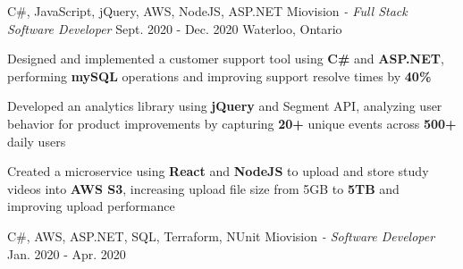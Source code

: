 \begin{siderules}
  \begin{cventries}
    \cventry
    {C\#, JavaScript, jQuery, AWS, NodeJS, ASP.NET}
    {Miovision\hspace{0.15em} \bodyfontlight\itshape{- Full Stack Software Developer}}
    {Sept. 2020 - Dec. 2020}
    {Waterloo, Ontario}
    {
      \begin{cvitems}
        \item{Designed and implemented a customer support tool using \textbf{C\#} and \textbf{ASP.NET}, performing \textbf{mySQL} operations and improving support resolve times by \textbf{40\%} }
        \item{Developed an analytics library using \textbf{jQuery} and Segment API, analyzing user behavior for product improvements by capturing \textbf{20+} unique events across \textbf{500+} daily users}
        \item {Created a microservice using \textbf{React} and \textbf{NodeJS} to upload and store study videos into \textbf{AWS S3}, increasing upload file size from 5GB to \textbf{5TB} and improving upload performance }
      \end{cvitems}
    }
    \cventry
    {C\#, AWS, ASP.NET, SQL, Terraform, NUnit}
    {Miovision\hspace{0.15em} \bodyfontlight\itshape{- Software Developer}}
    {Jan. 2020 - Apr. 2020}

\end{cventries}
\end{siderules}
